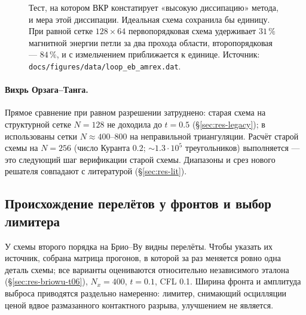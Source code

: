 \documentclass[12pt,a4paper]{article}
\newcommand{\code}[1]{\texttt{#1}}
\begin{document}
\begin{figure}[htbp]\centering
{}
\caption{Тест, на котором ВКР констатирует «высокую диссипацию» метода, и
мера этой диссипации. Идеальная схема сохранила бы единицу. При равной сетке
$128\times64$ первопорядковая схема удерживает $31\,\%$ магнитной энергии
петли за два прохода области, второпорядковая --- $84\,\%$, и с измельчением
приближается к единице. Источник:
\code{docs/figures/data/loop\_eb\_amrex.dat}.}
\label{fig:loop}
\end{figure}

\paragraph{Вихрь Орзага--Танга.} Прямое сравнение при равном разрешении
затруднено: старая схема на структурной сетке $N=128$ не доходила
до $t=0.5$ (\S\ref{sec:res-legacy}); в \cite{shamanov2025,avdeeva2019}
использованы сетки $N\approx400\text{--}800$ на неправильной триангуляции.
Расчёт старой схемы на $N=256$ (число Куранта $0.2$;
$\sim1.3\!\cdot\!10^5$ треугольников) выполняется --- это следующий шаг
верификации старой схемы. Диапазоны и срез нового решателя совпадают с
литературой (\S\ref{sec:res-lit}).

\subsection{Происхождение перелётов у фронтов и выбор лимитера}
\label{sec:res-rp1}

У схемы второго порядка на Брио--Ву видны перелёты. Чтобы указать их источник,
собрана матрица прогонов, в которой за раз меняется ровно одна деталь схемы;
все варианты оцениваются относительно независимого эталона
(\S\ref{sec:res-briowu-t06}), $N_x=400$, $t=0.1$, CFL 0.1. Ширина фронта и
амплитуда выброса приводятся раздельно намеренно: лимитер, снимающий
осцилляции ценой вдвое размазанного контактного разрыва, улучшением не
является.
\end{document}

